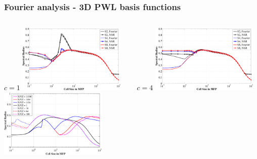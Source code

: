 \documentclass[compress,10pt]{beamer}
\begin{document}
\begin{frame}[t]\frametitle{Fourier analysis - 3D PWL basis functions}
\begin{columns}
\begin{block}{$c=1$}
\centering
{}\includegraphics[width=0.8\textwidth]{images/SI_MIP_hex_C=1_LS2,4,8_F&NSR_PDT.png} \\
{}\includegraphics[width=0.8\textwidth]{images/SI_MIP_hex_LS8_C=1_AR.eps}
\end{block}
\begin{block}{$c=4$}
\centering
{}\includegraphics[width=0.8\textwidth]{images/SI_MIP_hex_C=4_LS2,4,8_F&NSR_PDT.png} \\

\end{block}
\end{columns}
\end{frame}
\end{document}
